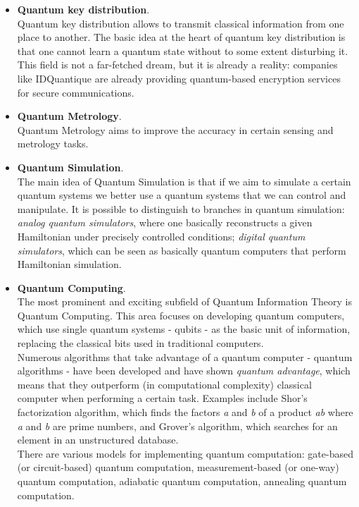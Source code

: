 \begin{itemize}
    \item \textbf{Quantum key distribution}.\\
    Quantum key distribution allows to transmit classical information from one place to another.
    The basic idea at the heart of quantum key distribution is that one cannot learn a quantum state without to some extent disturbing it.
    This field is not a far-fetched dream, but it is already a reality: companies like IDQuantique are already providing quantum-based encryption 
    services for secure communications.
    \item \textbf{Quantum Metrology}.\\
    Quantum Metrology aims to improve the accuracy in certain sensing and metrology tasks.
    \item \textbf{Quantum Simulation}.\\
    The main idea of Quantum Simulation is that if we aim to simulate a certain quantum systems we better use a quantum systems that we can
    control and manipulate.
    It is possible to distinguish to branches in quantum simulation: \textit{analog quantum simulators}, where
    one basically reconstructs a given Hamiltonian under precisely controlled conditions; \textit{digital quantum simulators}, which can 
    be seen as basically quantum computers that perform Hamiltonian simulation.
    \item \textbf{Quantum Computing}.\\
    The most prominent and exciting subfield of Quantum Information Theory is Quantum Computing. This area focuses on developing quantum computers, 
    which use single quantum systems - qubits - as the basic unit of information, replacing the classical bits used in traditional computers.\\
    Numerous algorithms that take advantage of a quantum computer - quantum algorithms - have been developed and have shown \textit{quantum advantage},
    which means that they outperform (in computational complexity) classical computer when performing a certain task.
    Examples include Shor's factorization algorithm, which finds the factors \textit{a} and \textit{b} of a product \textit{ab} where 
    \textit{a} and \textit{b} are prime numbers, and Grover's algorithm, which searches for an element in an unstructured database.\\
    There are various models for implementing quantum computation: gate-based (or circuit-based) quantum computation, measurement-based (or one-way) 
    quantum computation, adiabatic quantum computation, annealing quantum computation.
\end{itemize}

